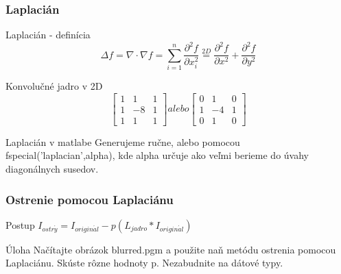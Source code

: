 \documentclass{beamer}
\begin{document}
\begin{frame}
\frametitle{Laplacián} 
  \begin{block}{Laplacián - definícia}
    $$\Delta f = \nabla \cdot \nabla f = \sum_{i=1}^n \frac{\partial^2 f}{\partial x_i^2} \stackrel{2D}{=} \frac{\partial^2 f}{\partial x^2} + \frac{\partial^2 f}{\partial y^2}$$
  \end{block}
  
  \begin{block}{Konvolučné jadro v 2D}
  $$\begin{bmatrix}
    1 & 1 & 1 \\
    1 & -8 & 1 \\
    1 & 1 & 1 
   \end{bmatrix}
   alebo
   \begin{bmatrix}
    0 & 1 & 0 \\
    1 & -4 & 1 \\
    0 & 1 & 0 
   \end{bmatrix}$$
  \end{block}
    
 \begin{block}{Laplacián v matlabe}
   Generujeme ručne, alebo pomocou fspecial('laplacian',alpha), kde alpha určuje ako veľmi berieme do úvahy diagonálnych susedov.
  \end{block}
\end{frame}

\begin{frame}
\frametitle{Ostrenie pomocou Laplaciánu} 
  \begin{block}{Postup}    
    $I_{ostr\acute{y}} = I_{origin\acute{a}l} - p \left( L_{jadro} \ast I_{origin\acute{a}l}\right)$
  \end{block}

  \begin{block}{Úloha}
  Načítajte obrázok blurred.pgm a použite naň metódu ostrenia pomocou Laplaciánu. Skúste rôzne hodnoty p. Nezabudnite na dátové typy.
  \end{block}
\end{frame}
\end{document}
